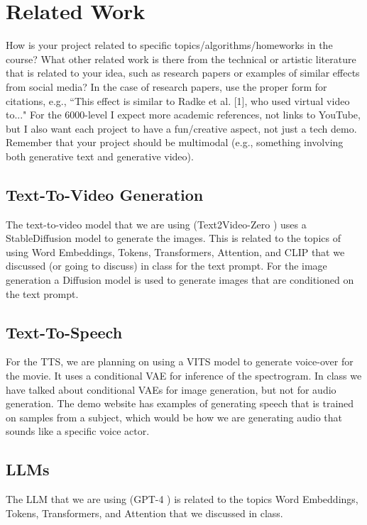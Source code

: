 \documentclass[conference]{IEEEtran}
\begin{document}
\section{Related Work}

\begin{tcolorbox}
How is your project related to specific topics/algorithms/homeworks in the course? What other related work is there from the technical or artistic literature that is related to your idea, such as research papers or examples of similar effects from social media? In the case of research papers, use the proper form for citations, e.g., “This effect is similar to Radke et al. [1], who used virtual video to..." For the 6000-level I expect more academic references, not links to YouTube, but I also want each project to have a fun/creative aspect, not just a tech demo. Remember that your project should be multimodal (e.g., something involving both generative text and generative video).
\end{tcolorbox}

\subsection{Text-To-Video Generation}
The text-to-video model that we are using (Text2Video-Zero \cite{text2vid}) uses a StableDiffusion \cite{stablediffusion} model
to generate the images. This is related to the topics of using Word Embeddings, Tokens, Transformers, Attention, and CLIP that we discussed
(or going to discuss) in class for the text prompt. For the image generation a Diffusion model is used to generate images
that are conditioned on the text prompt.

\subsection{Text-To-Speech}
For the TTS, we are planning on using a VITS model to generate voice-over for the movie.
It uses a conditional VAE for inference of the spectrogram. In class we have talked about
conditional VAEs for image generation, but not for audio generation.
The demo website \cite{vits-demo} has examples of generating speech that is trained
on samples from a subject, which would be how we are generating audio that
sounds like a specific voice actor.

\subsection{LLMs}
The LLM that we are using (GPT-4 \cite{gpt4}) is related to the topics
Word Embeddings, Tokens, Transformers, and Attention that we discussed in class.
\end{document}
